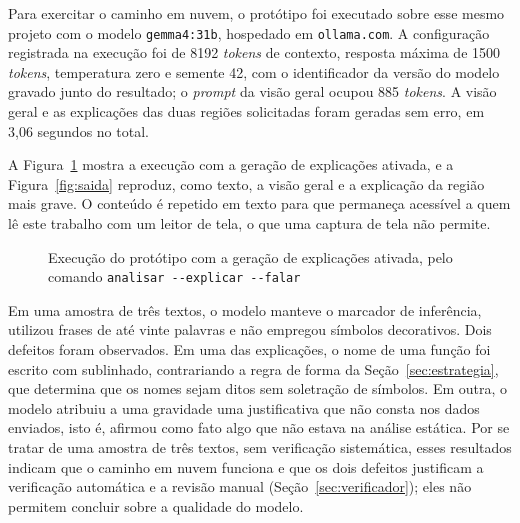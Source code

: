 \documentclass[
    12pt,                   %
    openright,              %
    oneside,                %
    a4paper,                %
    sumario=tradicional,    %
    english,                %
    brazil,                 %
    ]{abntex2}
\begin{document}
Para exercitar o caminho em nuvem, o protótipo foi executado sobre esse mesmo projeto com o modelo \texttt{gemma4:31b}, hospedado em \texttt{ollama.com}. A configuração registrada na execução foi de 8192 \textit{tokens} de contexto, resposta máxima de 1500 \textit{tokens}, temperatura zero e semente 42, com o identificador da versão do modelo gravado junto do resultado; o \textit{prompt} da visão geral ocupou 885 \textit{tokens}. A visão geral e as explicações das duas regiões solicitadas foram geradas sem erro, em 3,06 segundos no total.

A Figura~\ref{fig:explicar} mostra a execução com a geração de explicações ativada, e a Figura~\ref{fig:saida} reproduz, como texto, a visão geral e a explicação da região mais grave. O conteúdo é repetido em texto para que permaneça acessível a quem lê este trabalho com um leitor de tela, o que uma captura de tela não permite.

\begin{figure}[htbp]
  \centering
  \caption{Execução do protótipo com a geração de explicações ativada, pelo comando \texttt{analisar -{}-explicar -{}-falar}}
  \label{fig:explicar}
\end{figure}



Em uma amostra de três textos, o modelo manteve o marcador de inferência, utilizou frases de até vinte palavras e não empregou símbolos decorativos. Dois defeitos foram observados. Em uma das explicações, o nome de uma função foi escrito com sublinhado, contrariando a regra de forma da Seção~\ref{sec:estrategia}, que determina que os nomes sejam ditos sem soletração de símbolos. Em outra, o modelo atribuiu a uma gravidade uma justificativa que não consta nos dados enviados, isto é, afirmou como fato algo que não estava na análise estática. Por se tratar de uma amostra de três textos, sem verificação sistemática, esses resultados indicam que o caminho em nuvem funciona e que os dois defeitos justificam a verificação automática e a revisão manual (Seção~\ref{sec:verificador}); eles não permitem concluir sobre a qualidade do modelo.
\end{document}
